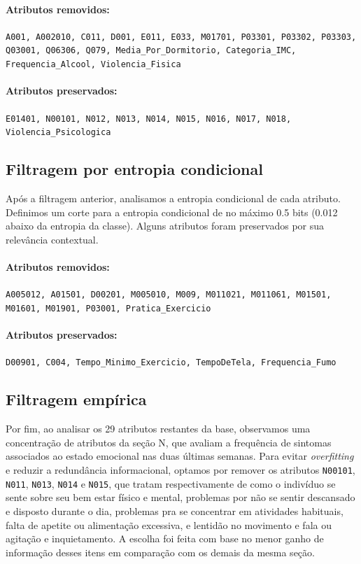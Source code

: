 \documentclass{article}
\begin{document}
\paragraph{Atributos removidos:}
\texttt{A001, A002010, C011, D001, E011, E033, M01701, P03301, P03302, P03303, Q03001, Q06306, Q079, Media\_Por\_Dormitorio, Categoria\_IMC, Frequencia\_Alcool, Violencia\_Fisica}

\paragraph{Atributos preservados:}
\texttt{E01401, N00101, N012, N013, N014, N015, N016, N017, N018, Violencia\_Psicologica}

\subsection*{Filtragem por entropia condicional}

Após a filtragem anterior, analisamos a entropia condicional de cada atributo. Definimos um corte para a entropia condicional de no máximo 0.5 bits (0.012 abaixo da entropia da classe). Alguns atributos foram preservados por sua relevância contextual.

\paragraph{Atributos removidos:}
\texttt{A005012, A01501, D00201, M005010, M009, M011021, M011061, M01501, M01601, M01901, P03001, Pratica\_Exercicio}

\paragraph{Atributos preservados:}
\texttt{D00901, C004, Tempo\_Minimo\_Exercicio, TempoDeTela, Frequencia\_Fumo}

\subsection*{Filtragem empírica}

Por fim, ao analisar os 29 atributos restantes da base, observamos uma concentração de atributos da seção N, que avaliam a frequência de sintomas associados ao estado emocional nas duas últimas semanas. Para evitar \textit{overfitting} e reduzir a redundância informacional, optamos por remover os atributos \texttt{N00101}, \texttt{N011}, \texttt{N013}, \texttt{N014} e \texttt{N015}, que tratam respectivamente de como o indivíduo se sente sobre seu bem estar físico e mental, problemas por não se sentir descansado e disposto durante o dia, problemas pra se concentrar em atividades habituais, falta de apetite ou alimentação excessiva, e lentidão no movimento e fala ou agitação e inquietamento. A escolha foi feita com base no menor ganho de informação desses itens em comparação com os demais da mesma seção.
\end{document}
